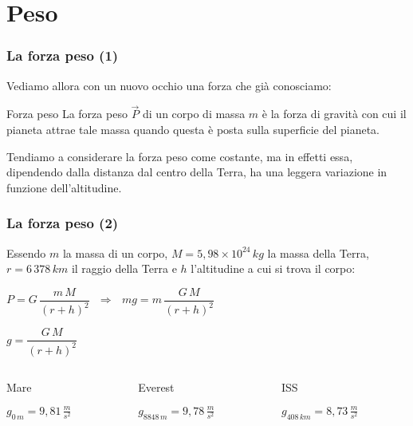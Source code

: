 \documentclass[]{beamer}
\theoremstyle{plain}
\begin{document}
\section{Peso}

\begin{frame}
\frametitle{La forza peso (1)}
Vediamo allora con un nuovo occhio una forza che già conosciamo:
\begin{block}{Forza peso}
La forza peso $ \vec{P} $ di un corpo di massa $ m $ è la forza di gravità con cui il pianeta attrae tale massa quando questa è posta sulla superficie del pianeta.
\end{block}\pause
Tendiamo a considerare la forza peso come costante, ma in effetti essa, dipendendo dalla distanza dal centro della Terra, ha una leggera \alert{variazione in funzione dell'altitudine}.
\end{frame}

\begin{frame}
\frametitle{La forza peso (2)}
Essendo $ m $ la massa di un corpo, $ M = 5,98 \times 10^{24} \, kg $ la massa della Terra, $ r = 6 \, 378 \, km $ il raggio della Terra e $ h $ l'altitudine a cui si trova il corpo:
\begin{center}
$ P = G \,  \dfrac{m \, M}{(r+h)^2} ~~~ \Longrightarrow ~~~ mg = m \,  \dfrac{G \, M}{(r+h)^2}  $
\end{center}\pause
\begin{center}
$ g = \dfrac{G \, M}{(r+h)^2} $
\end{center}\pause
\begin{columns}
\begin{column}{0.3\textwidth}
\begin{center}
Mare

$ g_{0 \, m} = 9,81 \, \frac{m}{s^2} $
\end{center}\pause
\end{column}
\begin{column}{0.3\textwidth}
\begin{center}
Everest

$ g_{8848 \, m} = 9,78 \, \frac{m}{s^2} $
\end{center}\pause
\end{column}
\begin{column}{0.3\textwidth}
\begin{center}
ISS

$ g_{408 \, km} = 8,73 \, \frac{m}{s^2} $
\end{center}
\end{column}
\end{columns}
\end{frame}
\end{document}
